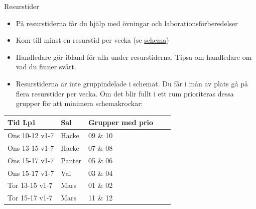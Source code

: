 \documentclass{lecturenotes}
\begin{document}
\begin{Slide}{Resurstider}
\begin{itemize}
\item På resurstiderna får du hjälp med övningar och laborationsförberedelser
\item Kom till minst en resurstid per vecka (se \href{http://cs.lth.se/eda016/schema/}{schema})
\item Handledare gör ibland  för alla under resurstiderna. Tipsa om handledare om vad du finner svårt.
\item Resurstiderna är inte gruppindelade i schemat. Du får i mån av plats gå på flera resurstider per vecka. Om det blir fullt i ett rum prioriteras dessa grupper för att minimera schemakrockar: 
\end{itemize}
\begin{table}[]
\centering\scriptsize
\begin{tabular}{lllll}
Tid Lp1 & Sal & Grupper med prio \\
\hline
Ons 10-12 v1-7 & Hacke  &   09 \& 10 \\
Ons 13-15 v1-7 & Hacke  &   07 \& 08  \\
Ons 15-17 v1-7 & Panter  & 05 \& 06   \\
Ons 15-17 v1-7 & Val       &  03 \& 04   \\
Tor 13-15 v1-7 & Mars     & 01 \& 02  \\
Tor 15-17 v1-7 & Mars     & 11 \& 12 \\ 
\end{tabular}
\end{table}
\end{Slide}




\end{document}
